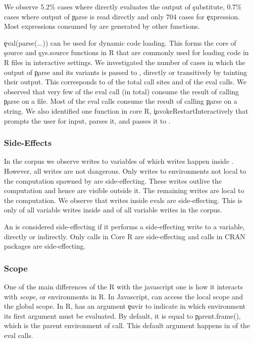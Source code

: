 \documentclass[USenglish,cleveref, autoref, thm-restate]{lipics-v2019}
\begin{document}
We observe 5.2\% cases where \eval directly evaluates the output of
\c{substitute}, 0.7\% cases where output of \c{parse} is read directly and
only 704 cases for \c{expression}. Most expressions consumed by \eval are
generated by other functions.

\c{eval(parse(...))} can be used for dynamic code loading. This forms the
core of \c{source} and \c{sys.source} functions in R that are commonly used
for loading code in R files in interactive settings. We investigated the
number of cases in which the output of \c{parse} and its variants is passed
to \eval, directly or transitively by tainting their output. This
corresponds to \PercentParsedCallSites of the total \eval call sites and
\PercentParsedEvals of the eval calls. We observed that very few of the eval
call (\NbParseFilesRnd in total) consume the result of calling \c{parse} on
a file. Most of the eval calls consume the result of calling \c{parse} on a
string.  We also identified one function in core R,
\c{invokeRestartInteractively} that prompts the user for input, parses it,
and passes it to \eval.

\subsubsection{Side-Effects}

In the corpus we observe \AllWritesRnd writes to variables of which
\EvalWritesRnd writes happen inside \eval. However, all writes are not
dangerous. Only writes to environments not local to the computation spawned
by \eval are side-effecting. These writes outlive the computation and hence
are visible outside it. The remaining writes are local to the
computation. We observe that \EvalSideEffectingWritesRnd writes inside evals
are side-effecting. This is only \EvalSideEffectingWritesEvalPerc of all
variable writes inside \eval and \EvalSideEffectingWritesAllPerc of all
variable writes in the corpus.

An \eval is considered side-effecting if it performs a side-effecting write to a
variable, directly or indirectly. Only \SideEffectingCoreCallPerc \eval calls in
Core R are side-effecting and \SideEffectingPackageCallPerc \eval calls in CRAN
packages are side-effecting.

\subsubsection{Scope}

One of the main differences of the R \eval with the javascript one is how it
interacts with \emph{scope}, or environments in R. In Javascript, \eval can
access the local scope and the global scope. In R, \eval has an argument
\c{envir} to indicate in which environment its first argument must be evaluated.
By default, it is equal to \c{parent.frame()},
which is the parent environment of \eval call. This default argument
happens in \DefaultEnvirExprPercent of the eval calls.
\end{document}
